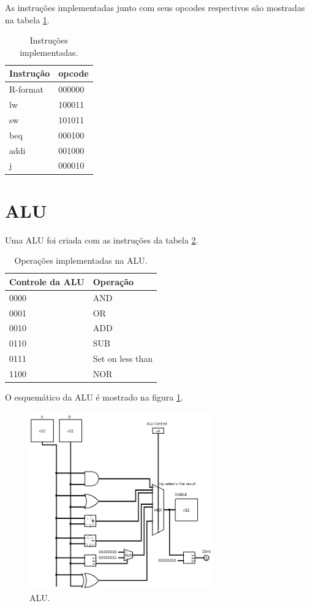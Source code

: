 \documentclass[12pt]{article}
\begin{document}
As instruções implementadas junto com seus opcodes respectivos são mostradas na tabela \ref{tab:procinstrucoes}.

\begin{table}[htbp]
\centering
\begin{tabular}{|l|l|}
\hline
Instrução & opcode\\
\hline
R-format & 000000\\
lw & 100011\\
sw & 101011\\
beq & 000100\\
addi & 001000\\
j & 000010\\
\hline
\end{tabular}
\caption{\label{tab:procinstrucoes}
Instruções implementadas.}

\end{table}



\section{ALU}
\label{sec:orga0ec175}
Uma ALU foi criada com as instruções da tabela \ref{tab:aluinstrucoes}.

\begin{table}[htbp]
\centering
\begin{tabular}{|l|l|}
\hline
Controle da ALU & Operação\\
\hline
0000 & AND\\
0001 & OR\\
0010 & ADD\\
0110 & SUB\\
0111 & Set on less than\\
1100 & NOR\\
\hline
\end{tabular}
\caption{\label{tab:aluinstrucoes}
Operações implementadas na ALU.}

\end{table}

O esquemático da ALU é mostrado na figura \ref{fig:alu}. 

\begin{figure}[htbp]
\centering
\includegraphics[width=300px]{./alu.png}
\caption{\label{fig:alu}
ALU.}
\end{figure}
\end{document}
